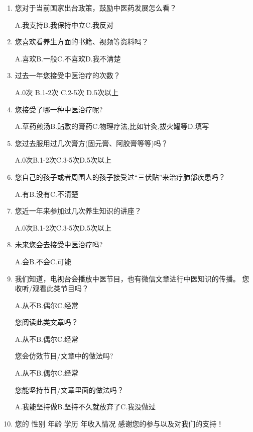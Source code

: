 \begin{enumerate}
A.愿意\qquad B.部分愿意\qquad C.不愿意 \qquad D.不好说

\item 
您对于当前国家出台政策，鼓励中医药发展怎么看？

A.我支持\qquad B.我保持中立\qquad C.我反对

\item 您喜欢看养生方面的书籍、视频等资料吗？

A.喜欢\qquad B.一般\qquad C.不喜欢\qquad D.我不清楚

\item
过去一年您接受中医治疗的次数？

A.0次 \qquad
B.1-2次\qquad
C.2-5次\qquad
D.5次以上

\item
您接受了哪一种中医治疗呢?

A.草药煎汤\qquad B.贴敷的膏药\qquad C.物理疗法,比如针灸,拔火罐等\qquad D.填写\underline{\makebox[6em]{}}

\item 您过去服用过几次膏方(固元膏、阿胶膏等等)吗？

A.0次\qquad B.1-2次\qquad C.3-5次\qquad D.5次以上

\item 您自己的孩子或者周围人的孩子接受过“三伏贴”来治疗肺部疾患吗？

A.有\qquad B.没有\qquad C.不清楚

\item 
您近一年来参加过几次养生知识的讲座？

A.0次\qquad B.1-2次\qquad C.3-5次\qquad D.5次以上

\item 
未来您会去接受中医治疗吗?

A.会\qquad B.不会\qquad C.可能 

\item 
我们知道，电视台会播放中医节目，也有微信文章进行中医知识的传播。
\subitem 
   您收听/观看此类节目吗？
   
    A.从不\qquad B.偶尔\qquad C.经常

	\subitem 
    您阅读此类文章吗？
	
    A.从不\qquad B.偶尔\qquad C.经常
    
    \subitem 
    您会仿效节目/文章中的做法吗?
	
	A.从不\qquad B.偶尔\qquad C.经常
    
    \subitem 
   您能坚持节目/文章里面的做法吗？
   
    A.我能坚持做\qquad B.坚持不久就放弃了\qquad C.我没做过
    
\item 
您的
性别\underline{\makebox[6em]{}}
年龄\underline{\makebox[6em]{}}
学历\underline{\makebox[6em]{}}
年收入情况\underline{\makebox[6em]{}}
\newline
感谢您的参与以及对我们的支持！
\end{enumerate}
